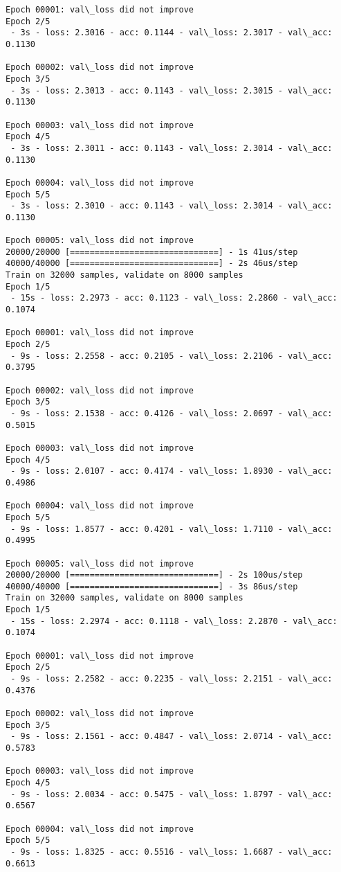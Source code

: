 \documentclass[11pt]{article}
\begin{document}
\begin{Verbatim}[commandchars=\\\{\}]
Epoch 00001: val\_loss did not improve
Epoch 2/5
 - 3s - loss: 2.3016 - acc: 0.1144 - val\_loss: 2.3017 - val\_acc: 0.1130

Epoch 00002: val\_loss did not improve
Epoch 3/5
 - 3s - loss: 2.3013 - acc: 0.1143 - val\_loss: 2.3015 - val\_acc: 0.1130

Epoch 00003: val\_loss did not improve
Epoch 4/5
 - 3s - loss: 2.3011 - acc: 0.1143 - val\_loss: 2.3014 - val\_acc: 0.1130

Epoch 00004: val\_loss did not improve
Epoch 5/5
 - 3s - loss: 2.3010 - acc: 0.1143 - val\_loss: 2.3014 - val\_acc: 0.1130

Epoch 00005: val\_loss did not improve
20000/20000 [==============================] - 1s 41us/step
40000/40000 [==============================] - 2s 46us/step
Train on 32000 samples, validate on 8000 samples
Epoch 1/5
 - 15s - loss: 2.2973 - acc: 0.1123 - val\_loss: 2.2860 - val\_acc: 0.1074

Epoch 00001: val\_loss did not improve
Epoch 2/5
 - 9s - loss: 2.2558 - acc: 0.2105 - val\_loss: 2.2106 - val\_acc: 0.3795

Epoch 00002: val\_loss did not improve
Epoch 3/5
 - 9s - loss: 2.1538 - acc: 0.4126 - val\_loss: 2.0697 - val\_acc: 0.5015

Epoch 00003: val\_loss did not improve
Epoch 4/5
 - 9s - loss: 2.0107 - acc: 0.4174 - val\_loss: 1.8930 - val\_acc: 0.4986

Epoch 00004: val\_loss did not improve
Epoch 5/5
 - 9s - loss: 1.8577 - acc: 0.4201 - val\_loss: 1.7110 - val\_acc: 0.4995

Epoch 00005: val\_loss did not improve
20000/20000 [==============================] - 2s 100us/step
40000/40000 [==============================] - 3s 86us/step
Train on 32000 samples, validate on 8000 samples
Epoch 1/5
 - 15s - loss: 2.2974 - acc: 0.1118 - val\_loss: 2.2870 - val\_acc: 0.1074

Epoch 00001: val\_loss did not improve
Epoch 2/5
 - 9s - loss: 2.2582 - acc: 0.2235 - val\_loss: 2.2151 - val\_acc: 0.4376

Epoch 00002: val\_loss did not improve
Epoch 3/5
 - 9s - loss: 2.1561 - acc: 0.4847 - val\_loss: 2.0714 - val\_acc: 0.5783

Epoch 00003: val\_loss did not improve
Epoch 4/5
 - 9s - loss: 2.0034 - acc: 0.5475 - val\_loss: 1.8797 - val\_acc: 0.6567

Epoch 00004: val\_loss did not improve
Epoch 5/5
 - 9s - loss: 1.8325 - acc: 0.5516 - val\_loss: 1.6687 - val\_acc: 0.6613


\end{Verbatim}
\end{document}
